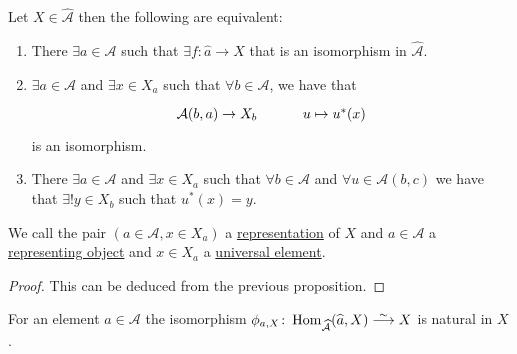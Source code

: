 \begin{defi/prop}
    Let $X\in \widehat{\mathcal{A}}$ then the following are equivalent:
    \begin{enumerate}
        \item 
        There $\exists a \in \mathcal{A}$ such that $\exists f \colon \widehat{a} \to X $ that is an isomorphism in $\widehat{\mathcal{A}}$.
        \item 
        $\exists a \in \mathcal{A}$ and $\exists x \in X_a$ such that $\forall b \in \mathcal{A}$, we have that
        \[
        \begin{tikzcd}
            \mathcal{A}(b,a) \to X_b 
             &
             u \mapsto u^*(x)
        \end{tikzcd}
        \]
        is an isomorphism.
        \item 
        There $\exists a \in \mathcal{A}$ and $\exists x \in X_a$ such that $\forall b \in \mathcal{A}$ and $\forall u \in \mathcal{A}(b,c)$ we have that $\exists! y\in X_b$ such that $u^*(x)=y$.
    \end{enumerate}
    We call the pair $(a \in \mathcal{A}, x \in X_a)$ a \underline{representation} of $X$ and $a\in \mathcal{A}$ a \underline{representing object} and $x \in X_a$ a \underline{universal element}.
\end{defi/prop}

\begin{proof}
    This can be deduced from the previous proposition.
\end{proof}

\begin{prop}
    For an element $a \in \mathcal{A}$ the isomorphism $\phi_{a,X} \colon \Hom_{\mathcal{\widehat{A}}}(\widehat{a},X) \isomorphism X$ is natural in $X$.
\end{prop}

